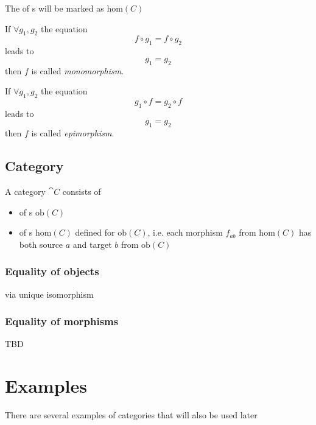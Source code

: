 \begin{remark}
\label{rem:morphclass}
The  of s will be marked as 
$\mathrm{hom}(C)$
\end{remark}

\begin{definition}[Monomorphism]
\label{def:monomorphism}
If $\forall g_1, g_2$ the equation 
\[
f \circ g_1 = f \circ g_2
\]
leads to 
\[
g_1 = g_2
\]
then $f$ is called \textit{monomorphism}.
\end{definition}

\begin{definition}[Epimorphism]
\label{def:epimorphism}
If $\forall g_1, g_2$ the equation 
\[
g_1 \circ f = g_2 \circ f
\]
leads to 
\[
g_1 = g_2
\]
then $f$ is called \textit{epimorphism}.
\end{definition}


\subsection{Category}

\begin{definition}[Category]
\label{def:category}
A category $\cat{C}$ consists of 
\begin{itemize}
\item {} of
s $\mathrm{ob}(C)$
\item {} of s $\mathrm{hom}(C)$
defined for $\mathrm{ob}(C)$, i.e. each morphism $f_{ab}$ from 
$\mathrm{hom}(C)$ has both source
$a$ and target $b$ from $\mathrm{ob}(C)$
\end{itemize}
\end{definition}

\subsubsection{Equality of objects}
via unique isomorphism

\subsubsection{Equality of morphisms}
TBD

\section{Examples}

There are several examples of categories that will also be used later

